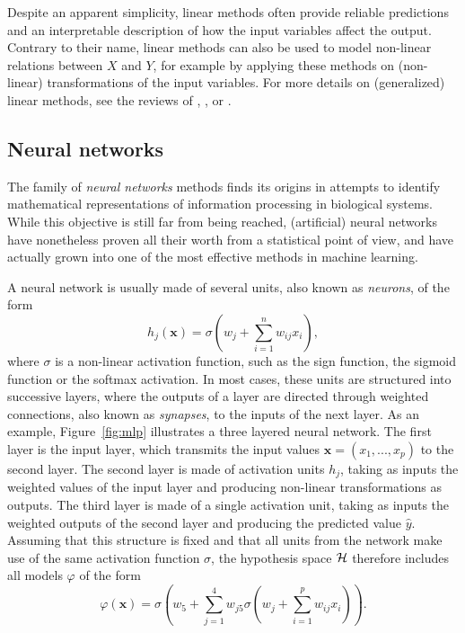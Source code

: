 Despite an apparent simplicity, linear methods often provide reliable
predictions and an interpretable description of how the input variables affect
the output. Contrary to their name, linear methods can also be used to model
non-linear relations between $X$ and $Y$, for example by applying these methods
on (non-linear) transformations of the input variables. For more details on
(generalized) linear methods, see the reviews of \citet{maccullagh:1989},
\citet{hastie:2005}, \citet{bishop:2006} or \citet{duda:2012}.

\subsection{Neural networks}

The family of \textit{neural networks} methods finds its origins in attempts to
identify mathematical representations of information processing in biological
systems. While this objective is still far from being reached, (artificial)
neural networks have nonetheless proven all their worth from a statistical point of
view, and have actually grown into one of the most effective methods in machine
learning.

A neural network is usually made of several units, also known as \textit{neurons}, of the form
\begin{equation}
h_j(\mathbf{x}) = \sigma(w_j + \sum_{i=1}^n w_{ij} x_i),
\end{equation}
where $\sigma$ is a non-linear activation function, such as the sign function,
the sigmoid function or the softmax activation. In most cases, these units are
structured into successive layers, where the outputs of a layer are directed
through weighted connections, also known as \textit{synapses}, to the inputs of
the next layer. As an example, Figure~\ref{fig:mlp} illustrates a three layered
neural network. The first layer is the input layer, which transmits the input
values $\mathbf{x} = (x_1, ..., x_p)$ to the second layer. The second layer is
made of activation units $h_j$, taking as inputs the weighted values of the
input layer and producing non-linear transformations as outputs. The third
layer is made of a single activation unit, taking as inputs the weighted
outputs of the second layer and producing the predicted value $\hat{y}$.
Assuming that this structure is fixed and that all units from the network make
use of the same activation function $\sigma$, the hypothesis space ${\cal H}$
therefore includes all models $\varphi$ of the form
\begin{equation}
\varphi(\mathbf{x}) = \sigma(w_5 + \sum_{j=1}^4 w_{j5} \sigma(w_j + \sum_{i=1}^p w_{ij} x_i)).
\end{equation}


